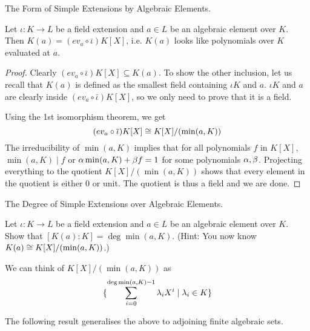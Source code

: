 \documentclass[../book.tex]{subfiles}
\begin{document}
\begin{thm} The Form of Simple Extensions by Algebraic Elements.

    Let $\iota : K \to L$ be a field extension and 
    $a \in L$ be an algebraic element over $K$. 
    Then $K(a) = (ev_a \circ\bar\iota)K[X]$,
    i.e. $K(a)$ looks like polynomials over $K$ evaluated at $a$.
\end{thm}
\begin{proof}
    Clearly $(ev_a\circ\bar\iota) K[X] \subseteq K(a)$.
    To show the other inclusion, let us recall that
    $K(a)$ is defined as the smallest field containing $\iota K$ and $a$.
    $\iota K$ and $a$ are clearly inside $(ev_a\circ\bar\iota) K[X]$,
    so we only need to prove that it is a field.
    
    Using the 1st isomorphism theorem, we get \[
        (ev_a\circ\overline{\iota}) K[X] \cong K[X]/(\min(a,K))
    \]
    The irreducibility of $\min(a,K)$ implies that 
    for all polynomials $f$ in $K[X]$, $\min(a,K) \mid f$ or 
    $\alpha \min(a,K) + \beta f = 1$ for some polynomials $\alpha, \beta$.
    Projecting everything to the quotient $K[X]/(\min(a,K))$ shows that
    every element in the quotient is either 0 or unit.
    The quotient is thus a field and we are done. 
\end{proof}
\begin{ex} The Degree of Simple Extensions over Algebraic Elements.

    Let $\iota : K \to L$ be a field extension and 
    $a \in L$ be an algebraic element over $K$. 
    Show that $[K(a):K] = \deg \min(a, K)$. 
    (Hint: You now know $K(a) \cong K[X]/(\min(a,K))$.)
\end{ex}
\begin{rmk}
    We can think of $K[X]/(\min(a,K))$ as 
    \[\displaystyle 
        \{\sum_{i=0}^{\deg\min(a,K) - 1} \lambda_i X^i \mid \lambda_i \in K\}
    \]
\end{rmk}

The following result generalises the above to adjoining finite algebraic sets.
\end{document}
